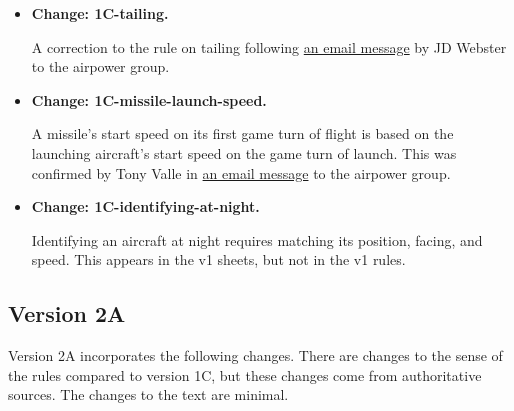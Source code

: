 \documentclass{report}
\newcommand{\changetag}[1]{\textbf{Change: #1.}\par}
\begin{document}
\begin{itemize}
    \item\changetag{1C-tailing}

        A correction to the rule on tailing following \href{https://airpower.groups.io/g/main/message/2847}{an email message} by JD Webster to the airpower group.

    \item\changetag{1C-missile-launch-speed}

        A missile's start speed on its first game turn of flight is based on the launching aircraft's start speed on the game turn of launch. This was confirmed by Tony Valle in \href{https://airpower.groups.io/g/main/message/3104}{an email message} to the airpower group.

    \item\changetag{1C-identifying-at-night}

        Identifying an aircraft at night requires matching its position, facing, and speed. This appears in the v1 sheets, but not in the v1 rules.

\end{itemize}

\subsection{Version 2A}

Version 2A incorporates the following changes. There are changes to the sense of the rules compared to version 1C, but these changes come from authoritative sources. The changes to the text are minimal.
\end{document}
